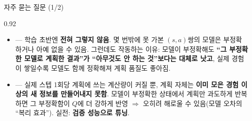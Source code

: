 \begin{frame}{자주 묻는 질문 (1/2)}
\begin{center}\begin{varwidth}{0.92\textwidth}
  \begin{itemize}
    \item {}
      --- 학습 초반엔 \textbf{전혀 그렇지 않음}. 몇 번밖에 못
      가본 $(s,a)$쌍의 모델은 부정확하거나 아예 없을 수 있음.
      그런데도 작동하는 이유: 모델이 부정확해도
      \textbf{``그 부정확한 모델로 계획한 결과''가 ``아무것도
      안 하는 것''보다는 대체로 낫고}, 실제 경험이 쌓일수록
      모델도 함께 정확해져 계획 품질도 좋아짐.
    \item {}
      --- 실제 스텝 1회당 계획에 쓰는 계산량이 커질 뿐, 계획
      자체는 \textbf{이미 모은 경험 이상의 새 정보를 만들어내지
      못함}. 모델이 부정확한 상태에서 계획만 과도하게 반복하면
      그 부정확함이 $Q$에 더 강하게 반영 $\Rightarrow$ 오히려
      해로울 수 있음(모델 오차의 ``복리 효과''). 실전:
      \textbf{검증 성능으로 튜닝}.
  \end{itemize}
\end{varwidth}\end{center}
\end{frame}
